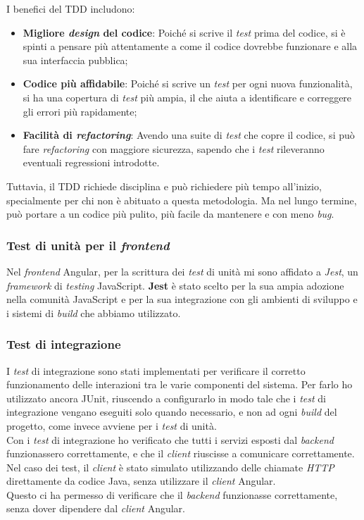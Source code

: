 I benefici del TDD includono:
\begin{itemize}
  \item \textbf{Migliore \textit{design} del codice}: Poiché si scrive il \textit{test} prima del codice, si è spinti a pensare più attentamente a come il codice dovrebbe funzionare e alla sua interfaccia pubblica;
  \item \textbf{Codice più affidabile}: Poiché si scrive un \textit{test} per ogni nuova funzionalità, si ha una copertura di \textit{test} più ampia, il che aiuta a identificare e correggere gli errori più rapidamente;
  \item \textbf{Facilità di \textit{refactoring}}: Avendo una suite di \textit{test} che copre il codice, si può fare \textit{refactoring} con maggiore sicurezza, sapendo che i \textit{test} rileveranno eventuali regressioni introdotte.
\end{itemize}

Tuttavia, il TDD richiede disciplina e può richiedere più tempo all'inizio, 
specialmente per chi non è abituato a questa metodologia. 
Ma nel lungo termine, può portare a un codice più pulito, più facile da mantenere e con meno \textit{bug}.

\subsubsection{Test di unità per il \textit{frontend}}
Nel \textit{frontend} Angular, per la scrittura dei \textit{test} di unità mi sono affidato a \textit{Jest}, 
un \textit{framework} di \textit{testing} JavaScript.
\textbf{Jest} è stato scelto per la sua ampia adozione nella comunità JavaScript 
e per la sua integrazione con gli ambienti di sviluppo e i sistemi di \textit{build} che abbiamo utilizzato. 

\subsubsection*{Test di integrazione}
I \textit{test} di integrazione sono stati implementati per verificare il corretto funzionamento 
delle interazioni tra le varie componenti del sistema.
Per farlo ho utilizzato ancora JUnit, riuscendo a configurarlo in modo tale che
i \textit{test} di integrazione vengano eseguiti solo quando necessario, 
e non ad ogni \textit{build} del progetto, come invece avviene per i \textit{test} di unità.\\

Con i \textit{test} di integrazione ho verificato che tutti i servizi esposti dal \textit{backend} funzionassero correttamente,
e che il \textit{client} riuscisse a comunicare correttamente.
Nel caso dei test, il \textit{client} è stato simulato utilizzando delle chiamate \textit{HTTP} 
direttamente da codice Java, senza utilizzare il \textit{client} Angular.\\
Questo ci ha permesso di verificare che il \textit{backend} funzionasse correttamente,
senza dover dipendere dal \textit{client} Angular.

